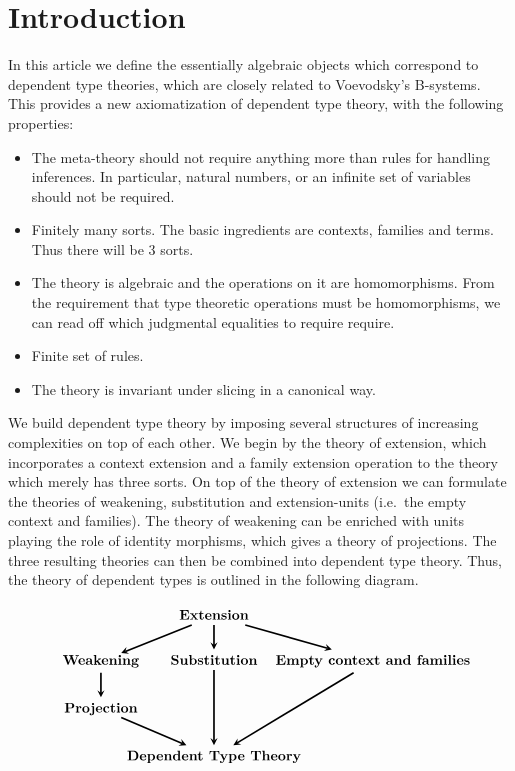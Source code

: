 \documentclass{article}
\begin{document}
\section{Introduction}
In this article we define the essentially algebraic objects which correspond to dependent
type theories, which are closely related to Voevodsky's B-systems. This provides
a new axiomatization of dependent type theory, with the following properties:
\begin{itemize}
\item The meta-theory should not require anything more than rules for handling
inferences. In particular, natural numbers, or an infinite set of variables 
should not be required.
\item Finitely many sorts. The basic ingredients are contexts, families and
terms. Thus there will be 3 sorts.
\item The theory is algebraic and the operations on it are homomorphisms. From
the requirement that type theoretic operations must be homomorphisms, we can
read off which judgmental equalities to require require.
\item Finite set of rules.
\item The theory is invariant under slicing in a canonical way.
\end{itemize}

We build
dependent type theory by imposing several structures of increasing complexities
on top of each other. We begin by the theory of extension, which incorporates
a context extension and a family extension operation to the theory which merely
has three sorts. On top of the theory of extension we can formulate the theories
of weakening, substitution and extension-units (i.e.~the empty context and families).
The theory of weakening can be enriched with units playing the role of identity
morphisms, which gives a theory of projections. The three resulting theories
can then be combined into dependent type theory. Thus, the theory of dependent
types is outlined in the following diagram.

\begin{equation*}
\begin{tikzcd}[ampersand replacement=\&,column sep=0em]
{} \& \textbf{Extension} \ar[very thick,-stealth]{dr} \ar[very thick,-stealth]{d} \ar[very thick,-stealth]{dl}
  \\
\makebox[.7cm]{\textbf{Weakening}} \ar[very thick,-stealth]{d} \& \textbf{Substitution} \ar[very thick,-stealth]{dd} \& \makebox[3cm]{\textbf{Empty context and families}} \ar[very thick,-stealth]{ddl}
\\
\makebox[.7cm]{\textbf{Projection}} \ar[very thick,-stealth]{dr}
\\
{} \& \textbf{Dependent Type Theory}
\end{tikzcd}
\end{equation*}
\end{document}
